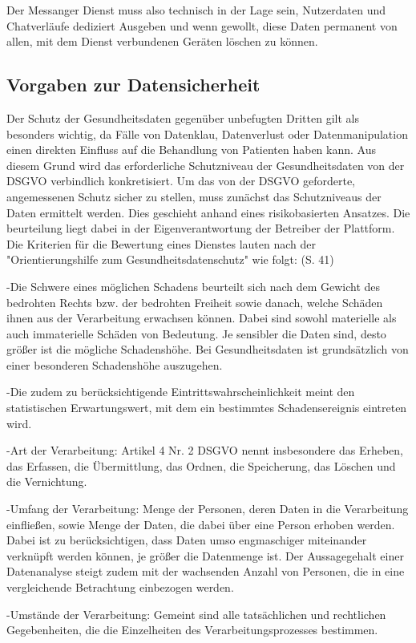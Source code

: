 Der Messanger Dienst muss also technisch in der Lage sein, Nutzerdaten und Chatverläufe dediziert Ausgeben und wenn gewollt, diese Daten permanent von allen, mit dem Dienst verbundenen Geräten löschen zu können. 

\subsection{Vorgaben zur Datensicherheit}\label{subsection:vzd}
Der Schutz der Gesundheitsdaten gegenüber unbefugten Dritten gilt als besonders wichtig, da Fälle von Datenklau, Datenverlust oder Datenmanipulation einen direkten Einfluss auf die Behandlung von Patienten haben kann. Aus diesem Grund wird das erforderliche Schutzniveau der Gesundheitsdaten von der DSGVO verbindlich konkretisiert.
Um das von der DSGVO geforderte, angemessenen Schutz sicher zu stellen, muss zunächst das Schutzniveaus der Daten ermittelt werden.
Dies geschieht anhand eines risikobasierten Ansatzes. Die beurteilung liegt dabei in der Eigenverantwortung der Betreiber der Plattform. Die Kriterien für die Bewertung eines Dienstes lauten nach der "Orientierungshilfe zum Gesundheitsdatenschutz" wie folgt:
(S. 41)

-Die Schwere eines möglichen Schadens beurteilt sich nach dem Gewicht des bedrohten Rechts bzw. der bedrohten Freiheit sowie danach, welche Schäden ihnen aus der Verarbeitung erwachsen können. Dabei sind sowohl materielle als auch immaterielle Schäden von Bedeutung. Je sensibler die Daten sind, desto größer ist die mögliche Schadenshöhe. Bei Gesundheitsdaten ist grundsätzlich von einer besonderen Schadenshöhe auszugehen.

-Die zudem zu berücksichtigende Eintrittswahrscheinlichkeit meint den statistischen Erwartungswert, mit dem ein bestimmtes Schadensereignis eintreten wird.

-Art der Verarbeitung: Artikel 4 Nr. 2 DSGVO nennt insbesondere das Erheben, das Erfassen, die Übermittlung, das Ordnen, die Speicherung, das Löschen und die Vernichtung.

-Umfang der Verarbeitung: Menge der Personen, deren Daten in die Verarbeitung einfließen, sowie Menge der Daten, die dabei über eine Person erhoben werden. Dabei ist zu berücksichtigen, dass Daten umso engmaschiger miteinander verknüpft werden können, je größer die Datenmenge ist. Der Aussagegehalt einer Datenanalyse steigt zudem mit der wachsenden Anzahl von Personen, die in eine vergleichende Betrachtung einbezogen werden.

-Umstände der Verarbeitung: Gemeint sind alle tatsächlichen und rechtlichen Gegebenheiten, die die Einzelheiten des Verarbeitungsprozesses bestimmen.

